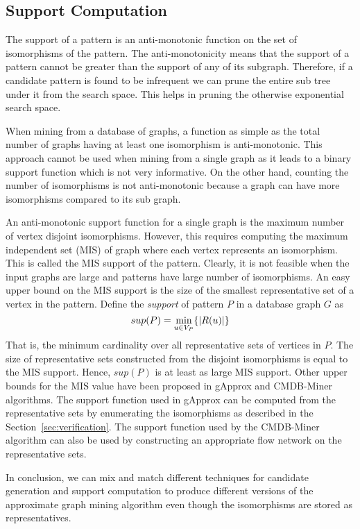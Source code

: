 \subsection{Support Computation} \label{sec:support} The support of a pattern is
an anti-monotonic function on the set of isomorphisms of the pattern. The
anti-monotonicity means that the support of a pattern cannot be greater than the
support of any of its subgraph. Therefore, if a candidate pattern is found to be
infrequent we can prune the entire sub tree under it from the search space.
This helps in pruning the otherwise exponential search space. 

When mining from a database of graphs, a function as simple as the total number
of graphs having at least one isomorphism is anti-monotonic. This approach cannot
be used when mining from a single graph as it leads to a binary support function
which is not very informative. On the other hand, counting the number of
isomorphisms is not anti-monotonic because a graph can have more isomorphisms
compared to its sub graph.

An anti-monotonic support function for a single graph is the maximum number of
vertex disjoint isomorphisms. However, this requires computing the maximum
independent set (MIS) of graph where each vertex represents an isomorphism.
This is called the MIS support of the pattern.
Clearly, it is not feasible when the input graphs are large and patterns have
large number of isomorphisms. An easy upper bound on the MIS support is the size
of the smallest representative set of a vertex in the pattern.  Define the {\em
support} of pattern $P$ in a database graph $G$ as $$sup(P) = \min_{u \in V_P}
\{ |R(u)| \}$$ That is, the minimum cardinality over all representative sets of
vertices in $P$.  The size of representative sets constructed from the disjoint
isomorphisms is equal to the MIS support. Hence, $sup(P)$ is at least as large
MIS support.  Other upper bounds for the MIS value have been proposed in gApprox
and CMDB-Miner algorithms. The support function used in gApprox can be computed
from the representative sets by enumerating the isomorphisms as described in the
Section~\ref{sec:verification}.  The support function used by the CMDB-Miner
algorithm can also be used by constructing an appropriate flow network on the
representative sets.

In conclusion, we can mix and match different techniques for candidate
generation and support computation to produce different versions of the
approximate graph mining algorithm even though the isomorphisms are stored as
representatives.

